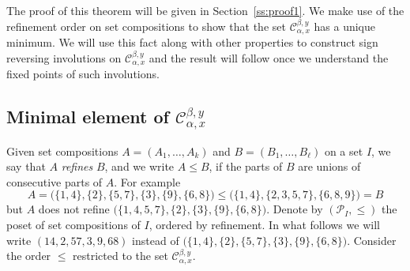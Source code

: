 
The proof of this theorem will be given in Section~\ref{ss:proof1}. We make use of the refinement order on set compositions to show that the set $\mathcal{C}_{\alpha,x}^{\beta,y}$ has a unique minimum. We will use this fact along with other properties to construct sign reversing involutions on $\mathcal{C}_{\alpha,x}^{\beta,y}$ and the result will follow once we understand the fixed points of such involutions.

\subsection{Minimal element of \texorpdfstring{$\mathcal{C}_{\alpha,x}^{\beta,y}$}{C alpha,x beta,y}}\label{ss:refinementonC}
Given set compositions $A=(A_1,\ldots,A_k)$ and $B=(B_1,\ldots,B_\ell)$ on a set $I$, 
we say that $A$ \emph{refines} $B$, and we write $A\le B$, if the parts of $B$ are unions of consecutive parts of $A$. For example
 $$A = \big(\{1,4\},\{2\},\{5,7\},\{3\},\{9\},\{6,8\}\big) \le \big(\{1,4\},\{2,3,5,7\},\{6,8,9\}\big)=B$$
but $A$ does not refine $\big(\{1,4,5,7\},\{2\},\{3\},\{9\},\{6,8\}\big)$. Denote by $(\mathcal{P}_I,\leq)$ the poset of set compositions of $I$, ordered by refinement.
In what follows we will write $(14,2,57,3,9,68)$ instead of $\big(\{1,4\},\{2\},\{5,7\},\{3\},\{9\},\{6,8\}\big)$. Consider the order $\le$ restricted to the set $\mathcal{C}_{\alpha,x}^{\beta,y}$.

